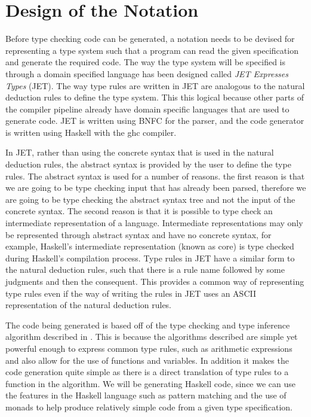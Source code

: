 \chapter{Design of the Notation}
\label{chap:Method}
Before type checking code can be generated, a notation needs to be devised for representing a type system such that a program can read the given specification and generate the required code.
The way the type system will be specified is through a domain specified language has been designed called \textit{JET Expresses Types} (JET).
The way type rules are written in JET are analogous to the natural deduction rules to define the type system.
This this logical because other parts of the compiler pipeline already have domain specific languages that are used to generate code.
JET is written using BNFC\cite{Pellauer2004BNFCM} for the parser, and the code generator is written using Haskell\cite{marlow2010haskell} with the ghc compiler\cite{marlow2004glasgow}.

In JET, rather than using the concrete syntax that is used in the natural deduction rules, the abstract syntax is provided by the user to define the type rules.
The abstract syntax is used for a number of reasons.
the first reason is that we are going to be type checking input that has already been parsed, therefore we are going to be type checking the abstract syntax tree and not the input of the concrete syntax.
The second reason is that it is possible to type check an intermediate representation of a language.
Intermediate representations may only be represented through abstract syntax and have no concrete syntax, for example, Haskell's intermediate representation (known as core) is type checked during Haskell's compilation process\cite{marlow2004glasgow}.
Type rules in JET have a similar form to the natural deduction rules, such that there is a rule name followed by some judgments and then the consequent.
This provides a common way of representing type rules even if the way of writing the rules in JET uses an ASCII representation of the natural deduction rules.

The code being generated is based off of the type checking and type inference algorithm described in \textcite{ranta2012implementing}.
This is because the algorithms described are simple yet powerful enough to express common type rules, such as arithmetic expressions and also allow for the use of functions and variables.
In addition it makes the code generation quite simple as there is a direct translation of type rules to a function in the algorithm.
We will be generating Haskell code, since we can use the features in the Haskell language such as pattern matching and the use of monads to help produce relatively simple code from a given type specification.

